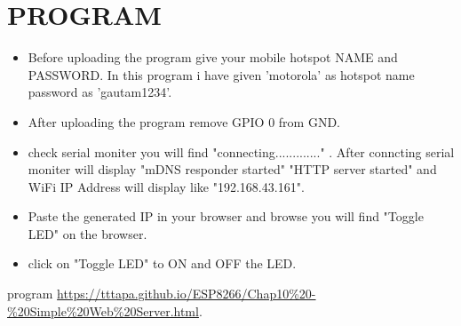 \documentclass[journal,12pt,twocolumn]{IEEEtran}
\begin{document}
\section{PROGRAM}

\begin{itemize}
\item Before uploading the program give your mobile hotspot NAME and PASSWORD. In this program i have given 'motorola' as hotspot name password as 'gautam1234'.
\item After uploading the program remove GPIO 0 from GND.
\item check serial moniter you will find "connecting............." . After conncting serial moniter will display 
"mDNS responder started"
"HTTP server started"
and WiFi IP Address will display like "192.168.43.161".
\item Paste the generated IP in your browser and browse you will find "Toggle LED" on the browser.
\item click on "Toggle LED" to ON and OFF the LED.
\end{itemize}
\begin{thebibliography}{00}
 program \url{https://tttapa.github.io/ESP8266/Chap10%20-%20Simple%20Web%20Server.html}.
\end{thebibliography}
\end{document}
